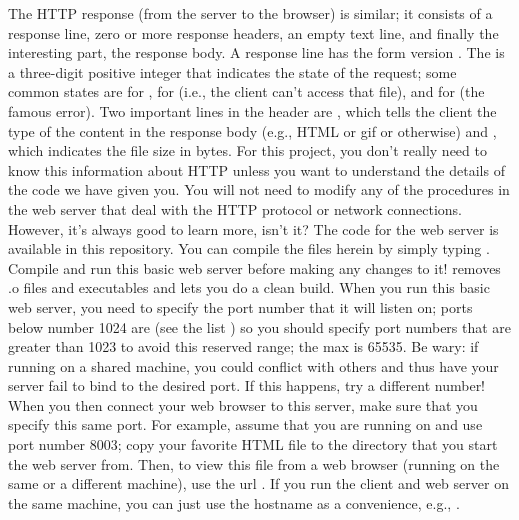 {}The HTTP response (from the server to the browser) is similar; it consists of a response line, zero or more response headers, an empty text line, and finally the interesting part, the response body. A response line has the form version . The  is a three-digit positive integer that indicates the state of the request; some common states are  for ,  for  (i.e., the client can't access that file), and  for  (the famous error). Two important lines in the header are , which tells the client the type of the content in the response body (e.g., HTML or gif or otherwise) and , which indicates the file size in bytes.\markdownRendererInterblockSeparator
{}For this project, you don't really need to know this information about HTTP unless you want to understand the details of the code we have given you. You will not need to modify any of the procedures in the web server that deal with the HTTP protocol or network connections. However, it's always good to learn more, isn't it?\markdownRendererInterblockSeparator
{}\markdownRendererInterblockSeparator
{}The code for the web server is available in this repository. You can compile the files herein by simply typing . Compile and run this basic web server before making any changes to it!  removes .o files and executables and lets you do a clean build.\markdownRendererInterblockSeparator
{}When you run this basic web server, you need to specify the port number that it will listen on; ports below number 1024 are  (see the list ) so you should specify port numbers that are greater than 1023 to avoid this reserved range; the max is 65535. Be wary: if running on a shared machine, you could conflict with others and thus have your server fail to bind to the desired port. If this happens, try a different number!\markdownRendererInterblockSeparator
{}When you then connect your web browser to this server, make sure that you specify this same port. For example, assume that you are running on  and use port number 8003; copy your favorite HTML file to the directory that you start the web server from. Then, to view this file from a web browser (running on the same or a different machine), use the url . If you run the client and web server on the same machine, you can just use the hostname  as a convenience, e.g., .\markdownRendererInterblockSeparator
